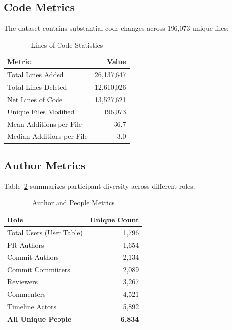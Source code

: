 \documentclass[11pt]{article}
\begin{document}
\subsection{Code Metrics}

The dataset contains substantial code changes across 196,073 unique files:

\begin{table}[H]
\centering
\caption{Lines of Code Statistics}
\label{tab:loc_stats}
\begin{tabular}{@{}lr@{}}
\toprule
\textbf{Metric} & \textbf{Value} \\
\midrule
Total Lines Added & 26,137,647 \\
Total Lines Deleted & 12,610,026 \\
Net Lines of Code & 13,527,621 \\
Unique Files Modified & 196,073 \\
Mean Additions per File & 36.7 \\
Median Additions per File & 3.0 \\
\bottomrule
\end{tabular}
\end{table}

\subsection{Author Metrics}

Table~\ref{tab:author_metrics} summarizes participant diversity across different roles.

\begin{table}[H]
\centering
\caption{Author and People Metrics}
\label{tab:author_metrics}
\begin{tabular}{@{}lr@{}}
\toprule
\textbf{Role} & \textbf{Unique Count} \\
\midrule
Total Users (User Table) & 1,796 \\
PR Authors & 1,654 \\
Commit Authors & 2,134 \\
Commit Committers & 2,089 \\
Reviewers & 3,267 \\
Commenters & 4,521 \\
Timeline Actors & 5,892 \\
\midrule
\textbf{All Unique People} & \textbf{6,834} \\
\bottomrule
\end{tabular}
\end{table}
\end{document}
